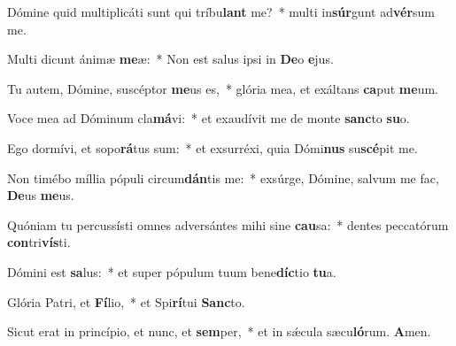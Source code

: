 \item Dómine quid multiplicáti sunt qui tríbu\textbf{lant} me?~* multi in\textbf{súr}gunt ad\textbf{vér}sum me.
\item Multi dicunt ánimæ \textbf{me}æ:~* Non est salus ipsi in \textbf{De}o \textbf{e}jus.
\item Tu autem, Dómine, suscéptor \textbf{me}us es,~* glória mea, et exáltans \textbf{ca}put \textbf{me}um.
\item Voce mea ad Dóminum cla\textbf{má}vi:~* et exaudívit me de monte \textbf{sanc}to \textbf{su}o.
\item Ego dormívi, et sopo\textbf{rá}tus sum:~* et exsurréxi, quia Dómi\textbf{nus} su\textbf{scé}pit me.
\item Non timébo míllia pópuli circum\textbf{dán}tis me:~* exsúrge, Dómine, salvum me fac, \textbf{De}us \textbf{me}us.
\item Quóniam tu percussísti omnes adversántes mihi sine \textbf{cau}sa:~* dentes peccatórum \textbf{con}tri\textbf{vís}ti.
\item Dómini est \textbf{sa}lus:~* et super pópulum tuum bene\textbf{díc}tio \textbf{tu}a.
\item Glória Patri, et \textbf{Fí}lio,~* et Spi\textbf{rí}tui \textbf{Sanc}to.
\item Sicut erat in princípio, et nunc, et \textbf{sem}per,~* et in sǽcula sæcu\textbf{ló}rum. \textbf{A}men.
